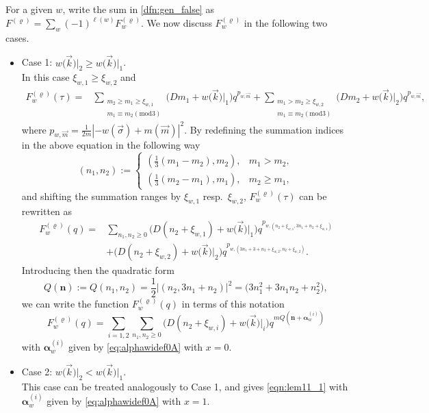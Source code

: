 \documentclass[pdftex]{sigma}
\def\m{m_\ast}
\def\bon{\mathbf{n}}
\def\bos{\varrho}
\def\bal{\boldsymbol{\alpha}}
\def\bon{\boldsymbol{n}}
\theoremstyle{definition}
\numberwithin{equation}{section}
\begin{document}
For a given $w$, write the sum in \eqref{dfn:gen_false} as $F^{(\bos)} = \sum_w (-1)^{\ell(w)}F^{(\bos)}_w$. We now discuss $F^{(\bos)}_w$ in the following two cases.
\begin{itemize}\itemsep=0pt
	\item
	Case 1: $w\bigl(\vec{k}\bigr)\lvert_2\geq w\bigl(\vec{k}\bigr)\lvert_1$. \\
	In this case $\xi_{w,1}\geq \xi_{w,2}$ and
	\begin{align*}
		F_w^{(\bos)}(\tau) = & \sum_{\substack{m_2\geq m_1\geq \xi_{w,1}\\
				m_1\equiv m_2 (\mathrm{mod}3)}} \bigl(Dm_1 + w\bigl(\vec{k}\bigr)\vert_1\bigr) q^{p_{w,\vec{m}}}
		+ \sum_{\substack{m_1>m_2\geq \xi_{w,2}\\m_1\equiv m_2 (\mathrm{mod} 3)}} \bigl(Dm_2 + w\bigl(\vec{k}\bigr)\vert_2\bigr) q^{p_{w,\vec{m}}},
	\end{align*}
	where ${p_{w,\vec{m}}} = \frac{1}{2m}|-w(\vec\sigma) + m(\vec m)|^2$. By redefining the summation indices in the above equation in the following way
	\begin{equation*}
		\left( n_{1},n_{2} \right):=\begin{cases}
			\left(\frac{1}{3}\left( m_{1}-m_{2} \right),m_{2} \right), & m_{1}> m_{2},\\
			\left(\frac{1}{3}\left( m_{2}-m_{1} \right),m_{1} \right), & m_{2}\ge m_{1},
		\end{cases}
	\end{equation*}
	and shifting the summation ranges by $\xi_{w,1}$ resp.\ $\xi_{w,2}$, $F^{(\bos )}_w(\tau)$ can be rewritten as
	\begin{align*}
		F_w^{(\bos)} (q) ={}& \sum_{n_1,n_2\geq 0}
		\bigl(D(n_2+\xi_{w,1})+w\bigl(\vec{k}\bigr)\vert_1\bigr)q^{p_{w,(n_2+\xi_{w,1},3n_1+n_2+\xi_{w,1})}}
		 \\
		& +
		\bigl(D(n_2+\xi_{w,2})+w\bigl(\vec{k}\bigr)\vert_2\bigr)
		q^{p_{w,(3n_1+3+n_2+\xi_{w,2},n_2+\xi_{w,2})}} .
	\end{align*}
	Introducing then the quadratic form
	\begin{equation*}
		Q(\bon):= Q(n_1,n_2) = \frac{
			1}{2}|(n_2,3n_1+n_2)|^2=
		\bigl(3n_{1}^2+3n_1n_2+n_2^2\bigr),
	\end{equation*}
	we can write the function $F_w^{(\bos)} (q)$ in terms of this notation
	\begin{equation}\label{eqn:lem11_1}
		F^{(\bos)}_w (q)=
		\sum_{i=1,2} \sum_{n_1,n_2\geq 0} \bigl(D(n_2+\xi_{w,i})+w\bigl(\vec{k}\bigr)\vert_i\bigr)q^{mQ(\bon+\bal_w^{(i)})}
	\end{equation}
	with $ \bal_w^{(i)}$ given by \eqref{eq:alphawidef0A} with $x=0$.
	
	\item Case 2: $w\bigl(\vec{k}\bigr)\lvert_2< w\bigl(\vec{k}\bigr)\lvert_1$. \\
	This case can be treated analogously to Case 1, and gives \eqref{eqn:lem11_1} with $\bal_w^{(i)}$ given by \eqref{eq:alphawidef0A} with $x=1$.
\end{itemize}
\end{document}
